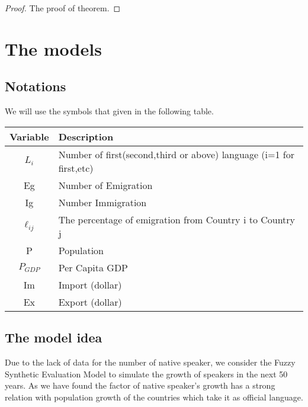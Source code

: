 \documentclass{mcmthesis}
\begin{document}
\begin{proof}
The proof of theorem.
\end{proof}
\section{The models}
\subsection{Notations}
We will use the symbols that given in the following table.
\begin{table}[h]
\begin{center}
\begin{tabular}{c l}
\hline
\multicolumn{1}{l}{Variable} & Description                                      \\
\hline
$L_i$                            & Number of first(second,third or above) language (i=1 for first,etc)                                       \\
Eg                           &Number of Emigration                                       \\
Ig                           &Number Immigration \\
$\ell_{ij}   $                       &The percentage of emigration from Country i to Country j                                         \\
P                            & Population                                \\
$P_{GDP}   $                         & Per Capita GDP                                   \\
Im                            & Import (dollar)                                       \\
Ex                            & Export (dollar)                                   \\
\hline
\end{tabular}
\end{center}
\end{table}

\subsection{The model idea}
\qquad Due to the lack of data for the number of native speaker, we consider the Fuzzy Synthetic Evaluation Model to simulate the growth of speakers in the next 50 years.
As we have found the factor of native speaker's growth has a strong relation with population growth of the countries which take it as official language.
\end{document}
